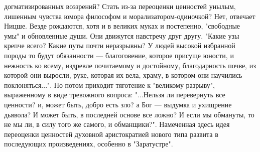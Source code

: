 \documentclass[12pt]{article}
\begin{document}
догматизированных воззрений? Стать из-за переоценки ценностей унылым, лишенным чувства юмора
философом и морализатором-одиночкой? Нет, отвечает Ницше. Везде рождаются, хотя и в великих муках и
постепенно, "свободные умы" и обновленные души. Они движутся навстречу друг другу. "Какие узы крепче
всего? Какие путы почти неразрывны? У людей высокой избранной породы то будут обязанности —
благоговение, которое присуще юности, и нежность ко всему, издревле почитаемому и достойному, 
благодарность почве, из которой они выросли, руке, которая их вела, храму, в котором они научились
поклоняться...". Но потом приходит тяготение к "великому разрыву", выраженному в виде тревожного вопроса:
"...Нельзя ли перевернуть все ценности? и, может быть, добро есть зло? а Бог — выдумка и ухищрение дьявола?
И может быть, в последней основе все ложно? И если мы обмануты, то не мы ли, в силу того же самого, и
обманщики?". Намеченная здесь идея переоценки ценностей духовной аристократией нового типа развита в
последующих произведениях, особенно в "Заратустре".


\newpage
\end{document}
